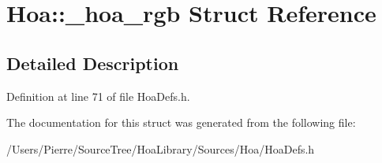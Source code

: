 \hypertarget{struct_hoa_1_1__hoa__rgb}{\section{Hoa\-:\-:\-\_\-hoa\-\_\-rgb Struct Reference}
\label{struct_hoa_1_1__hoa__rgb}
}


\subsection{Detailed Description}


Definition at line 71 of file Hoa\-Defs.\-h.



The documentation for this struct was generated from the following file\-:\begin{DoxyCompactItemize}
\item 
/\-Users/\-Pierre/\-Source\-Tree/\-Hoa\-Library/\-Sources/\-Hoa/Hoa\-Defs.\-h\end{DoxyCompactItemize}
